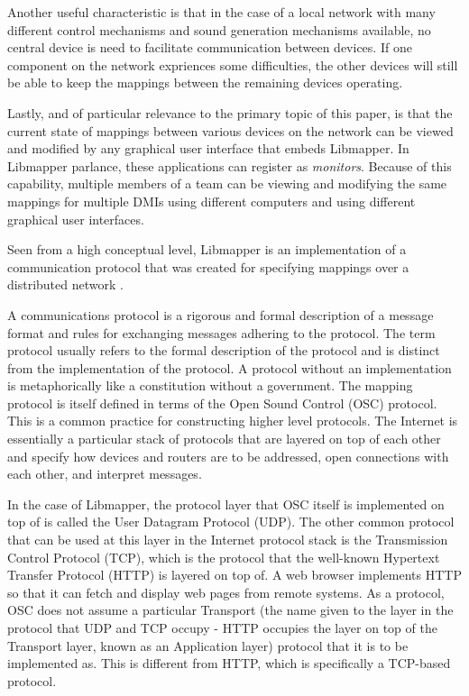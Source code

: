 Another useful characteristic is that in the case of a local network with many different control mechanisms and sound generation mechanisms available, no central device is need to facilitate communication between devices. If one component on the network expriences some difficulties, the other devices will still be able to keep the mappings between the remaining devices operating.  

Lastly, and of particular relevance to the primary topic of this paper, is that the current state of mappings between various devices on the network can be viewed and modified by any graphical user interface that embeds Libmapper. In Libmapper parlance, these applications can register as \emph{monitors}. Because of this capability, multiple members of a team can be viewing and modifying the same mappings for multiple DMIs using different computers and using different graphical user interfaces.  

Seen from a high conceptual level, Libmapper is an implementation of a communication protocol that was created for specifying mappings over a distributed network \cite{Malloch2009}. 

A communications protocol is a rigorous and formal description of a message format and rules for exchanging messages adhering to the protocol. The term protocol usually refers to the formal description of the protocol and is distinct from the implementation of the protocol. A protocol without an implementation is metaphorically like a constitution without a government. The mapping protocol is itself defined in terms of the Open Sound Control (OSC) protocol. This is a common practice for constructing higher level protocols. The Internet is essentially a particular stack of protocols that are layered on top of each other and specify how devices and routers are to be addressed, open connections with each other, and interpret messages.

In the case of Libmapper, the protocol layer that OSC itself is implemented on top of is called the User Datagram Protocol (UDP). The other common protocol that can be used at this layer in the Internet protocol stack is the Transmission Control Protocol (TCP), which is the protocol that the well-known Hypertext Transfer Protocol (HTTP) is layered on top of. A web browser implements HTTP so that it can fetch and display web pages from remote systems. As a protocol, OSC does not assume a particular Transport (the name given to the layer in the protocol that UDP and TCP occupy - HTTP occupies the layer on top of the Transport layer, known as an Application layer) protocol that it is to be implemented as. This is different from HTTP, which is specifically a TCP-based protocol.

